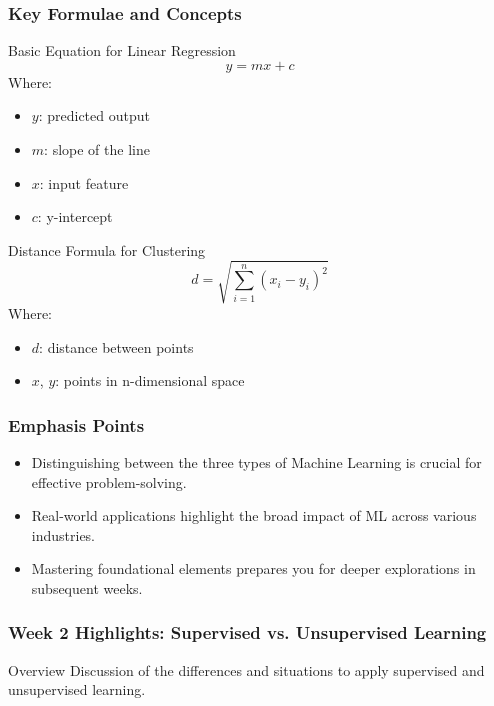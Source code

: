 \documentclass[aspectratio=169]{beamer}
\begin{document}
\begin{frame}[fragile]
    \frametitle{Key Formulae and Concepts}
    \begin{block}{Basic Equation for Linear Regression}
        \begin{equation}
            y = mx + c
        \end{equation}
        Where:
        \begin{itemize}
            \item \(y\): predicted output
            \item \(m\): slope of the line
            \item \(x\): input feature
            \item \(c\): y-intercept
        \end{itemize}
    \end{block}

    \begin{block}{Distance Formula for Clustering}
        \begin{equation}
            d = \sqrt{\sum_{i=1}^n (x_i - y_i)^2}
        \end{equation}
        Where:
        \begin{itemize}
            \item \(d\): distance between points
            \item \(x\), \(y\): points in n-dimensional space
        \end{itemize}
    \end{block}
\end{frame}

\begin{frame}[fragile]
    \frametitle{Emphasis Points}
    \begin{itemize}
        \item Distinguishing between the three types of Machine Learning is crucial for effective problem-solving.
        \item Real-world applications highlight the broad impact of ML across various industries.
        \item Mastering foundational elements prepares you for deeper explorations in subsequent weeks.
    \end{itemize}
\end{frame}

\begin{frame}[fragile]
    \frametitle{Week 2 Highlights: Supervised vs. Unsupervised Learning}
    \begin{block}{Overview}
        Discussion of the differences and situations to apply supervised and unsupervised learning.
    \end{block}
\end{frame}
\end{document}
